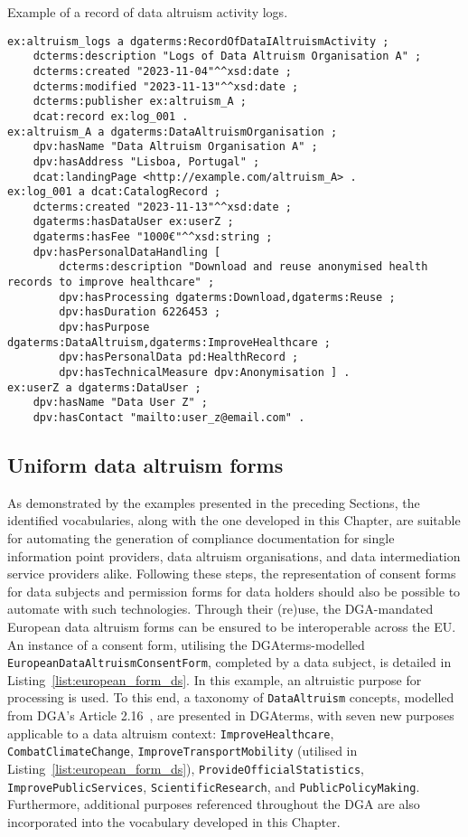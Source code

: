 \begin{listing}[ht]
\caption[Data altruism activity logs.]{Example of a record of data altruism activity logs.}
\label{list:activity_log}
\begin{verbatim}
ex:altruism_logs a dgaterms:RecordOfDataIAltruismActivity ;
    dcterms:description "Logs of Data Altruism Organisation A" ;
    dcterms:created "2023-11-04"^^xsd:date ; 
    dcterms:modified "2023-11-13"^^xsd:date ;
    dcterms:publisher ex:altruism_A ;
    dcat:record ex:log_001 .
ex:altruism_A a dgaterms:DataAltruismOrganisation ;
    dpv:hasName "Data Altruism Organisation A" ;
    dpv:hasAddress "Lisboa, Portugal" ;
    dcat:landingPage <http://example.com/altruism_A> .
ex:log_001 a dcat:CatalogRecord ;
    dcterms:created "2023-11-13"^^xsd:date ;
    dgaterms:hasDataUser ex:userZ ;
    dgaterms:hasFee "1000€"^^xsd:string ;
    dpv:hasPersonalDataHandling [
        dcterms:description "Download and reuse anonymised health records to improve healthcare" ;
        dpv:hasProcessing dgaterms:Download,dgaterms:Reuse ;
        dpv:hasDuration 6226453 ;
        dpv:hasPurpose dgaterms:DataAltruism,dgaterms:ImproveHealthcare ;
        dpv:hasPersonalData pd:HealthRecord ;
        dpv:hasTechnicalMeasure dpv:Anonymisation ] .
ex:userZ a dgaterms:DataUser ;
    dpv:hasName "Data User Z" ;
    dpv:hasContact "mailto:user_z@email.com" .
\end{verbatim}
\end{listing}

\subsection{Uniform data altruism forms}
\label{sec:dga_forms}

As demonstrated by the examples presented in the preceding Sections, the identified vocabularies, along with the one developed in this Chapter, are suitable for automating the generation of compliance documentation for single information point providers, data altruism organisations, and data intermediation service providers alike.
Following these steps, the representation of consent forms for data subjects and permission forms for data holders should also be possible to automate with such technologies.
Through their (re)use, the DGA-mandated European data altruism forms can be ensured to be interoperable across the EU.
An instance of a consent form, utilising the DGAterms-modelled \texttt{EuropeanDataAltruismConsentForm}, completed by a data subject, is detailed in Listing~\ref{list:european_form_ds}.
In this example, an altruistic purpose for processing is used.
To this end, a taxonomy of \texttt{DataAltruism} concepts, modelled from DGA's Article 2.16~\citeyearpar{noauthor_regulation_2022}, are presented in DGAterms, with seven new purposes applicable to a data altruism context: \texttt{ImproveHealthcare}, \texttt{CombatClimateChange}, \texttt{ImproveTransportMobility} (utilised in Listing~\ref{list:european_form_ds}), \texttt{ProvideOfficialStatistics}, \texttt{ImprovePublicServices}, \texttt{ScientificResearch}, and \texttt{PublicPolicyMaking}.
Furthermore, additional purposes referenced throughout the DGA are also incorporated into the vocabulary developed in this Chapter.

